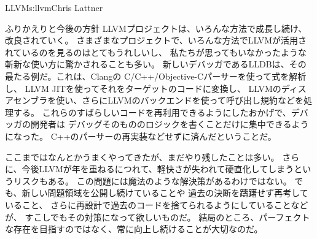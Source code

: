 \begin{aosachapter}{LLVM}{s:llvm}{Chris Lattner}
\begin{aosasect1}{ふりかえりと今後の方針}
LLVMプロジェクトは、いろんな方法で成長し続け、改良されていく。
さまざまなプロジェクトで、いろんな方法でLLVMが活用されているのを見るのはとてもうれしいし、
私たちが思ってもいなかったような斬新な使い方に驚かされることも多い。
新しいデバッガであるLLDBは、その最たる例だ。これは、Clangの
C/C++/Objective-Cパーサーを使って式を解析し、
LLVM JITを使ってそれをターゲットのコードに変換し、
LLVMのディスアセンブラを使い、さらにLLVMのバックエンドを使って呼び出し規約などを処理する。
これらのすばらしいコードを再利用できるようにしたおかげで、デバッガの開発者は
デバッグそのもののロジックを書くことだけに集中できるようになった。
C++のパーサーの再実装などせずに済んだということだ。

ここまではなんとかうまくやってきたが、まだやり残したことは多い。
さらに、今後LLVMが年を重ねるにつれて、軽快さが失われて硬直化してしまうというリスクもある。
この問題には魔法のような解決策があるわけではない。
でも、新しい問題領域を公開し続けていることや
過去の決断を躊躇せず再考していること、
さらに再設計で過去のコードを捨てられるようにしていることなどが、
すこしでもその対策になって欲しいものだ。
結局のところ、パーフェクトな存在を目指すのではなく、常に向上し続けることが大切なのだ。

\end{aosasect1}

\end{aosachapter}
